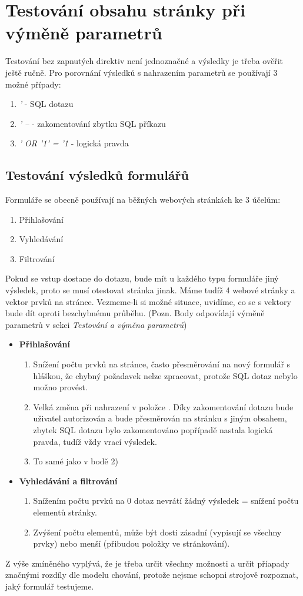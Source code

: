 \documentclass[12pt, a4paper]{report}
\begin{document}
\section{Testování obsahu stránky při výměně parametrů}
Testování bez zapnutých direktiv není jednoznačné a výsledky je třeba ověřit ještě ručně. Pro porovnání výsledků s nahrazením parametrů se používají 3 možné případy:
\begin{enumerate}
\item \textit{'} -  SQL dotazu
\item \textit{' --} - zakomentování zbytku SQL příkazu
\item \textit{' OR '1' = '1} - logická pravda
\end{enumerate}

\subsection{Testování výsledků formulářů}
Formuláře se obecně používají na běžných webových stránkách ke 3 účelům:
\begin{enumerate}
\item Přihlašování
\item Vyhledávání 
\item Filtrování
\end{enumerate}
Pokud se  vstup dostane do dotazu, bude mít u každého typu formuláře jiný výsledek, proto se musí otestovat stránka jinak. Máme tudíž 4 webové stránky a vektor prvků na stránce. Vezmeme-li si možné situace, uvidíme, co se s vektory bude dít oproti bezchybnému průběhu. (Pozn. Body odpovídají výměně parametrů v sekci \textit{Testování a výměna parametrů})

\begin{itemize}
\item \textbf{Přihlašování}
\begin{enumerate}
\item Snížení počtu prvků na stránce, často přesměrování na nový formulář s hláškou, že chybný požadavek nelze zpracovat, protože SQL dotaz nebylo možno provést.
\item Velká změna při nahrazení v položce . Díky zakomentování dotazu bude uživatel autorizován a bude přesměrován na stránku s jiným obsahem, zbytek SQL dotazu bylo zakomentováno popřípadě nastala logická pravda, tudíž vždy vrací výsledek.
\item To samé jako v bodě 2)
\end{enumerate}
\item \textbf{Vyhledávání a filtrování}
\begin{enumerate}
\item Snížením počtu prvků na 0 dotaz nevrátí žádný výsledek = snížení počtu elementů stránky.
\item Zvýšení počtu elementů, může být dosti zásadní (vypisují se všechny prvky) nebo menší (přibudou položky ve stránkování).
\end{enumerate}
\end{itemize}
Z výše zmíněného vyplývá, že je třeba určit všechny možnosti a určit příapady značnými rozdíly dle modelu chování, protože nejsme schopni strojově rozpoznat, jaký formulář testujeme.
\end{document}
